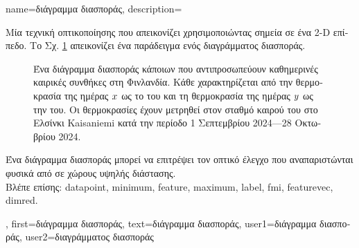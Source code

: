 {name={\foreignlanguage{greek}{διάγραμμα διασποράς}}, 
	description={\foreignlanguage{greek}{Μία} 
		\foreignlanguage{greek}{τεχνική οπτικοποίησης που απεικονίζει}  \foreignlanguage{greek}{χρησιμοποιώντας 
		σημεία σε ένα} 2-D \foreignlanguage{greek}{επίπεδο. Το Σχ.} \ref{fig_scatterplot_temp_FMI_dict} \foreignlanguage{greek}{απεικονίζει 
		ένα παράδειγμα ενός διαγράμματος διασποράς.}   
		\begin{figure}[H]
			\begin{center}
				\vspace*{-10mm}
			\end{center}
			{
			\caption{\foreignlanguage{greek}{Ένα διάγραμμα διασποράς κάποιων}  \foreignlanguage{greek}{που 
				αντιπροσωπεύουν καθημερινές καιρικές συνθήκες στη Φινλανδία. Κάθε} 
				 \foreignlanguage{greek}{χαρακτηρίζεται από την}  
				\foreignlanguage{greek}{θερμοκρασία της ημέρας $x$ ως το} 
				 \foreignlanguage{greek}{του και τη}  \foreignlanguage{greek}{θερμοκρασία 
				της ημέρας $y$ ως την}  \foreignlanguage{greek}{του. 
				Οι θερμοκρασίες έχουν μετρηθεί στον σταθμό καιρού του}  \foreignlanguage{greek}{στο Ελσίνκι} 
				Kaisaniemi \foreignlanguage{greek}{κατά την περίοδο 1 Σεπτεμβρίου 2024—28 Οκτωβρίου 2024.} }
			\label{fig_scatterplot_temp_FMI_dict}}
			\vspace*{-3mm}
			\end{figure}
			\foreignlanguage{greek}{Ένα διάγραμμα διασποράς μπορεί να επιτρέψει τον οπτικό έλεγχο}  
			\foreignlanguage{greek}{που αναπαριστώνται φυσικά από}  
			\foreignlanguage{greek}{σε χώρους υψηλής διάστασης.}\\
			 \foreignlanguage{greek}{Βλέπε επίσης:} \gls{datapoint}, \gls{minimum}, \gls{feature}, \gls{maximum}, \gls{label}, \gls{fmi}, \gls{featurevec}, \gls{dimred}.},
		first={\foreignlanguage{greek}{διάγραμμα διασποράς}},
		text={\foreignlanguage{greek}{διάγραμμα διασποράς}},
		user1={\foreignlanguage{greek}{διάγραμμα διασποράς}}, %
  		user2={\foreignlanguage{greek}{διαγράμματος διασποράς}} %
}

